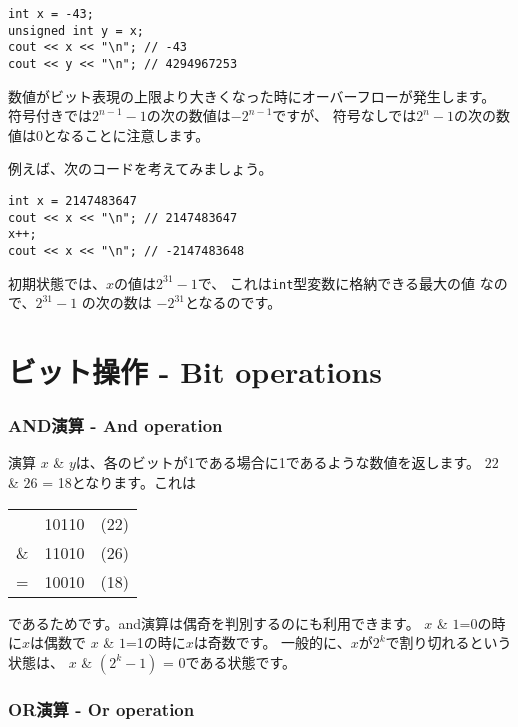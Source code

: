 \begin{lstlisting}
int x = -43;
unsigned int y = x;
cout << x << "\n"; // -43
cout << y << "\n"; // 4294967253
\end{lstlisting}

数値がビット表現の上限より大きくなった時にオーバーフローが発生します。
符号付きでは$2^{n-1}-1$の次の数値は$-2^{n-1}$ですが、
符号なしでは$2^n-1$の次の数値は$0$となることに注意します。

例えば、次のコードを考えてみましょう。
\begin{lstlisting}
int x = 2147483647
cout << x << "\n"; // 2147483647
x++;
cout << x << "\n"; // -2147483648
\end{lstlisting}

初期状態では、$x$の値は$2^{31}-1$で、
これは\texttt{int}型変数に格納できる最大の値 なので、$2^{31}-1$ の次の数は $-2^{31}$となるのです。

\section{ビット操作 - Bit operations}

\newcommand\XOR{\mathbin{\char`\^}}

\subsubsection{AND演算 - And operation}


 演算 $x$ \& $y$は、各のビットが1である場合に1であるような数値を返します。
$22$ \& $26$ = 18となります。これは
\begin{center}
\begin{tabular}{rrr}
& 10110 & (22)\\
\& & 11010 & (26) \\
\hline
 = & 10010 & (18) \\
\end{tabular}
\end{center}

であるためです。and演算は偶奇を判別するのにも利用できます。
$x$ \& $1$=0の時に$x$は偶数で
$x$ \& $1$=1の時に$x$は奇数です。
一般的に、$x$が$2^k$で割り切れるという状態は、
$x$ \& $(2^k-1)$ = 0である状態です。

\subsubsection{OR演算 - Or operation}

